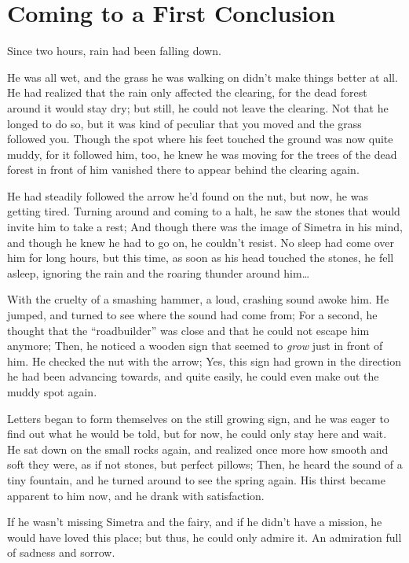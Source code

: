 \chapter{Coming to a First Conclusion}
\label{cha:coming-first-concl}
Since two hours, rain had been falling down.

He was all wet, and the grass he was walking on didn't make things better at all. He had realized that the rain only affected the clearing, for the dead forest around it would stay dry; but still, he could not leave the clearing. Not that he longed to do so, but it was kind of peculiar that you moved and the grass followed you. Though the spot where his feet touched the ground was now quite muddy, for it followed him, too, he knew he was moving for the trees of the dead forest in front of him vanished there to appear behind the clearing again.

He had steadily followed the arrow he'd found on the nut, but now, he was getting tired. Turning around and coming to a halt, he saw the stones that would invite him to take a rest; And though there was the image of Simetra in his mind, and though he knew he had to go on, he couldn't resist. No sleep had come over him for long hours, but this time, as soon as his head touched the stones, he fell asleep, ignoring the rain and the roaring thunder around him\dots

With the cruelty of a smashing hammer, a loud, crashing sound awoke him. 
He jumped, and turned to see where the sound had come from; For a second, he thought that the \enquote{roadbuilder} was close and that he could not escape him anymore;
Then, he noticed a wooden sign that seemed to \emph{grow} just in front of him.
He checked the nut with the arrow; Yes, this sign had grown in the direction he had been advancing towards, and quite easily, he could even make out the muddy spot again.

Letters began to form themselves on the still growing sign, and he was eager to find out what he would be told, but for now, he could only stay here and wait. 
He sat down on the small rocks again, and realized once more how smooth and soft they were, as if not stones, but perfect pillows; Then, he heard the sound of a tiny fountain, and he turned around to see the spring again. His thirst became apparent to him now, and he drank with satisfaction.

If he wasn't missing Simetra and the fairy, and if he didn't have a mission, he would have loved this place; but thus, he could only admire it. 
An admiration full of sadness and sorrow.

